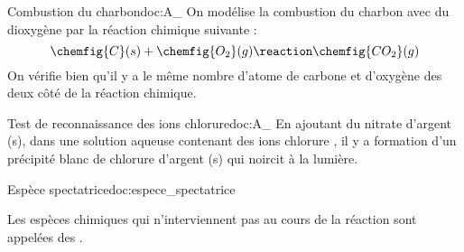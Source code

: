 \begin{doc}{Combustion du charbon}{doc:A_}
  On modélise la combustion du charbon avec du dioxygène par la réaction chimique suivante :
  \begin{equation*}
    \chemfig{C}(s) + \chemfig{O_2}(g) \reaction \chemfig{CO_2}(g)
  \end{equation*}
  On vérifie bien qu'il y a le même nombre d'atome de carbone et d'oxygène des deux côté de la réaction chimique.
\end{doc}





\begin{doc}{Test de reconnaissance des ions chlorure}{doc:A_}
  En ajoutant du nitrate d'argent (s), dans une solution aqueuse contenant des ions chlorure , il y a formation d'un précipité blanc de chlorure d'argent (s) qui noircit à la lumière.
\end{doc}



\vspace*{-4pt}
\begin{doc}{Espèce spectatrice}{doc:espece_spectatrice}
  \begin{encart}
    Les espèces chimiques qui n'interviennent pas au cours de la réaction sont appelées des .
  \end{encart}
\end{doc}
